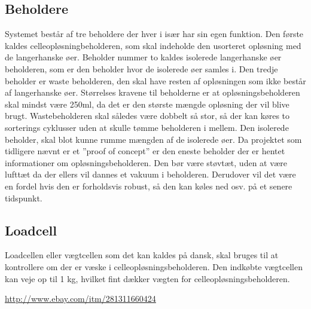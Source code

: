 \subsection{Beholdere}
Systemet består af tre beholdere der hver i især har sin egen funktion. Den første kaldes celleopløsningbeholderen, som skal indeholde den usorteret opløsning med de langerhanske øer. Beholder nummer to kaldes isolerede langerhanske øer beholderen, som er den beholder hvor de isolerede øer samles i. Den tredje beholder er waste beholderen, den skal have resten af opløsningen som ikke består af langerhanske øer. Størrelses kravene til beholderne er at opløsningsbeholderen skal mindst være 250ml, da det er den største mængde opløsning der vil blive brugt. Wastebeholderen skal således være dobbelt så stor, så der kan køres to sorterings cyklusser uden at skulle tømme beholderen i mellem. Den isolerede beholder, skal blot kunne rumme mængden af de isolerede øer. Da projektet som tidligere nævnt er et ”proof of concept” er den eneste beholder der er hentet informationer om opløsningsbeholderen. Den bør være støvtæt, uden at være lufttæt da der ellers vil dannes et vakuum i beholderen. Derudover vil det være en fordel hvis den er forholdsvis robust, så den kan køles ned osv. på et senere tidspunkt.

\subsection{Loadcell}
Loadcellen eller vægtcellen som det kan kaldes på dansk, skal bruges til at kontrollere om der er væske i celleopløsningsbeholderen. Den indkøbte vægtcellen kan veje op til 1 kg, hvilket fint dækker vægten for celleopløsningsbeholderen.

\url{http://www.ebay.com/itm/281311660424}

